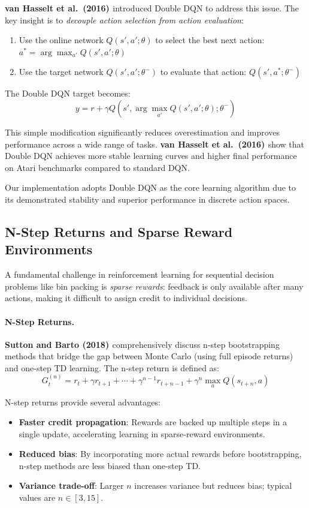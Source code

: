 \textbf{van Hasselt et al.\ (2016) \cite{vHGS16}} introduced Double DQN to address this issue. The key insight is to \textit{decouple action selection from action evaluation}:
\begin{enumerate}
\item Use the online network $Q(s', a'; \theta)$ to select the best next action: $a^* = \arg\max_{a'} Q(s', a'; \theta)$
\item Use the target network $Q(s', a'; \theta^-)$ to evaluate that action: $Q(s', a^*; \theta^-)$
\end{enumerate}

The Double DQN target becomes:
\[
y = r + \gamma Q(s', \arg\max_{a'} Q(s', a'; \theta); \theta^-)
\]

This simple modification significantly reduces overestimation and improves performance across a wide range of tasks. \textbf{van Hasselt et al.\ (2016) \cite{vHGS16}} show that Double DQN achieves more stable learning curves and higher final performance on Atari benchmarks compared to standard DQN.

Our implementation adopts Double DQN as the core learning algorithm due to its demonstrated stability and superior performance in discrete action spaces.

\subsection{N-Step Returns and Sparse Reward Environments}

A fundamental challenge in reinforcement learning for sequential decision problems like bin packing is \textit{sparse rewards}: feedback is only available after many actions, making it difficult to assign credit to individual decisions.

\paragraph{N-Step Returns.}
\textbf{Sutton and Barto (2018) \cite{SB18}} comprehensively discuss n-step bootstrapping methods that bridge the gap between Monte Carlo (using full episode returns) and one-step TD learning. The n-step return is defined as:
\[
G_t^{(n)} = r_t + \gamma r_{t+1} + \cdots + \gamma^{n-1} r_{t+n-1} + \gamma^n \max_{a} Q(s_{t+n}, a)
\]

N-step returns provide several advantages:
\begin{itemize}
\item \textbf{Faster credit propagation}: Rewards are backed up multiple steps in a single update, accelerating learning in sparse-reward environments.
\item \textbf{Reduced bias}: By incorporating more actual rewards before bootstrapping, n-step methods are less biased than one-step TD.
\item \textbf{Variance trade-off}: Larger $n$ increases variance but reduces bias; typical values are $n \in [3, 15]$.
\end{itemize}

